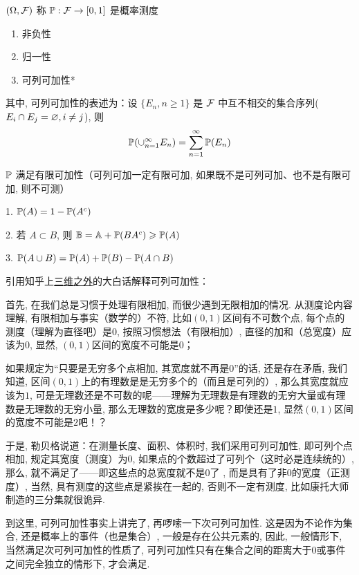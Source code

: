 \begin{definition}[概率测度]\label{def:prob_measure}
    $(\Omega, \mathcal{F})$ 称 $\mathbb{P}: \mathcal{F}\rightarrow [0,1]$ 是概率测度
    \begin{enumerate}
        \item 非负性
        \item 归一性
        \item 可列可加性*
    \end{enumerate}
    其中, 可列可加性的表述为：设 $\{E_n, n\geq 1\}$ 是 $\mathcal{F}$ 中互不相交的集合序列($E_i\cap E_j=\varnothing, i\neq j$), 则
    \[
    \mathbb{P}(\cup_{n=1}^{\infty}E_n)=\sum_{n=1}^{\infty}\mathbb{P}(E_n)
    \]
\end{definition}

\begin{property}
$\mathbb{P}$ 满足有限可加性（可列可加一定有限可加, 如果既不是可列可加、也不是有限可加, 则不可测）
\end{property}

\begin{corollary}\label{cor:set_operation}
    1. $\mathbb{P}(A)=1-\mathbb{P}(A^c)$

    2. 若 $A\subset B$, 则 $\mathbb{B}=\mathbb{A}+\mathbb{P}(BA^c)\geqslant \mathbb{P}(A)$

    3. $\mathbb{P}(A\cup B)=\mathbb{P}(A)+\mathbb{P}(B)-\mathbb{P}(A\cap B)$
\end{corollary}

\begin{remark}
    引用知乎上\href{https://www.zhihu.com/question/25836213/answer/1204497999}{三维之外}的大白话解释可列可加性：

    首先, 在我们总是习惯于处理有限相加, 而很少遇到无限相加的情况. 从测度论内容理解, 有限相加与事实（数学的）不符, 比如$(0,1)$区间有不可数个点, 每个点的测度（理解为直径吧）是$0$, 按照习惯想法（有限相加）, 直径的加和（总宽度）应该为$0$, 显然, $(0,1)$区间的宽度不可能是$0$；
    
    如果规定为“只要是无穷多个点相加, 其宽度就不再是$0$”的话, 还是存在矛盾, 我们知道, 区间$(0,1)$上的有理数是是无穷多个的（而且是可列的）, 那么其宽度就应该为$1$, 可是无理数还是不可数的呢——理解为无理数是有理数的无穷大量或有理数是无理数的无穷小量, 那么无理数的宽度是多少呢？即使还是$1$, 显然$(0,1)$区间的宽度不可能是$2$吧！？
    
    于是, 勒贝格说道：在测量长度、面积、体积时, 我们采用可列可加性, 即可列个点相加, 规定其宽度（测度）为$0$, 如果点的个数超过了可列个（这时必是连续统的）, 那么, 就不满足了——即这些点的总宽度就不是$0$了 , 而是具有了非$0$的宽度（正测度）, 当然, 具有测度的这些点是紧挨在一起的, 否则不一定有测度, 比如康托大师制造的三分集就很诡异. 
    
    到这里, 可列可加性事实上讲完了, 再啰嗦一下次可列可加性. 这是因为不论作为集合, 还是概率上的事件（也是集合）, 一般是存在公共元素的, 因此, 一般情形下, 当然满足次可列可加性的性质了, 可列可加性只有在集合之间的距离大于$0$或事件之间完全独立的情形下, 才会满足. 
\end{remark}


